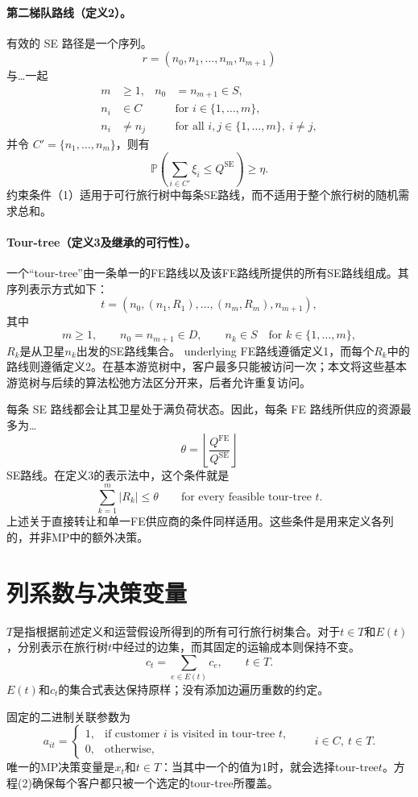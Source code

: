 \documentclass{article}
\begin{document}
\paragraph{第二梯队路线（定义2）。}
有效的 SE 路径是一个序列。
\[
r=(n_0,n_1,\ldots,n_m,n_{m+1})
\]
与…一起
\begin{align*}
m&\geq1, & n_0&=n_{m+1}\in S,\\
n_i&\in C &&\text{for }i\in\{1,\ldots,m\},\\
n_i&\neq n_j &&\text{for all }i,j\in\{1,\ldots,m\},\ i\neq j,
\end{align*}
并令 $C'=\{n_1,\ldots,n_m\}$，则有
\begin{equation}
\mathbb P\left(\sum_{i\in C'}\xi_i\leq Q^{\mathrm{SE}}\right)\geq\eta.
\tag{1}
\end{equation}
约束条件（1）适用于可行旅行树中每条SE路线，而不适用于整个旅行树的随机需求总和。

\paragraph{Tour-tree（定义3及继承的可行性）。}
一个“tour-tree”由一条单一的FE路线以及该FE路线所提供的所有SE路线组成。其序列表示方式如下：
\[
t=(n_0,(n_1,R_1),\ldots,(n_m,R_m),n_{m+1}),
\]
其中
\[
m\geq1,\qquad n_0=n_{m+1}\in D,\qquad
n_k\in S\quad\text{for }k\in\{1,\ldots,m\},
\]
$R_k$是从卫星$n_k$出发的SE路线集合。 underlying FE路线遵循定义1，而每个$R_k$中的路线则遵循定义2。在基本游览树中，客户最多只能被访问一次；本文将这些基本游览树与后续的算法松弛方法区分开来，后者允许重复访问。

每条 SE 路线都会让其卫星处于满负荷状态。因此，每条 FE 路线所供应的资源最多为…
\[
\theta=\left\lfloor\frac{Q^{\mathrm{FE}}}{Q^{\mathrm{SE}}}\right\rfloor
\]
SE路线。在定义3的表示法中，这个条件就是
\[
\sum_{k=1}^{m}|R_k|\leq\theta
\qquad\text{for every feasible tour-tree }t.
\]
上述关于直接转让和单一FE供应商的条件同样适用。这些条件是用来定义各列的，并非MP中的额外决策。

\section*{列系数与决策变量}
$T$是指根据前述定义和运营假设所得到的所有可行旅行树集合。对于$t\in T$和$E(t)$，分别表示在旅行树$t$中经过的边集，而其固定的运输成本则保持不变。
\[
c_t=\sum_{e\in E(t)}c_e,\qquad t\in T.
\]
$E(t)$和$c_t$的集合式表达保持原样；没有添加边遍历重数的约定。

固定的二进制关联参数为
\[
a_{it}=\begin{cases}
1,&\text{if customer }i\text{ is visited in tour-tree }t,\\
0,&\text{otherwise},
\end{cases}
\qquad i\in C,\ t\in T.
\]
唯一的MP决策变量是$x_t$和$t\in T$：当其中一个的值为1时，就会选择tour-tree$t$。方程(2)确保每个客户都只被一个选定的tour-tree所覆盖。
\end{document}
